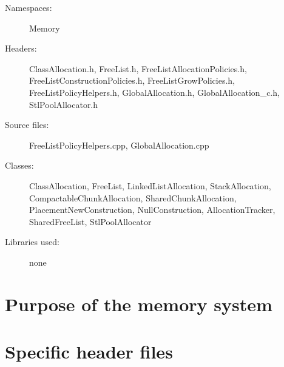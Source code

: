 \begin{description}
  \item[Namespaces:] Memory
  \item[Headers:] ClassAllocation.h, FreeList.h, FreeListAllocationPolicies.h, Free\-List\-Construction\-Policies.h, FreeListGrowPolicies.h, Free\-List\-Policy\-Hel\-pers\-.h, GlobalAllocation.h, GlobalAllocation\_c.h, StlPoolAllocator.h
  \item[Source files:] FreeListPolicyHelpers.cpp, GlobalAllocation.cpp
  \item[Classes:] ClassAllocation, FreeList, LinkedListAllocation, Stack\-Allocation, CompactableChunkAllocation, SharedChunkAllocation, Placement\-New\-Construction, NullConstruction, AllocationTracker, Shared\-Free\-List, Stl\-Pool\-Allocator
  \item[Libraries used:] none
\end{description}


\section{Purpose of the memory system}

\section{Specific header files}


%


